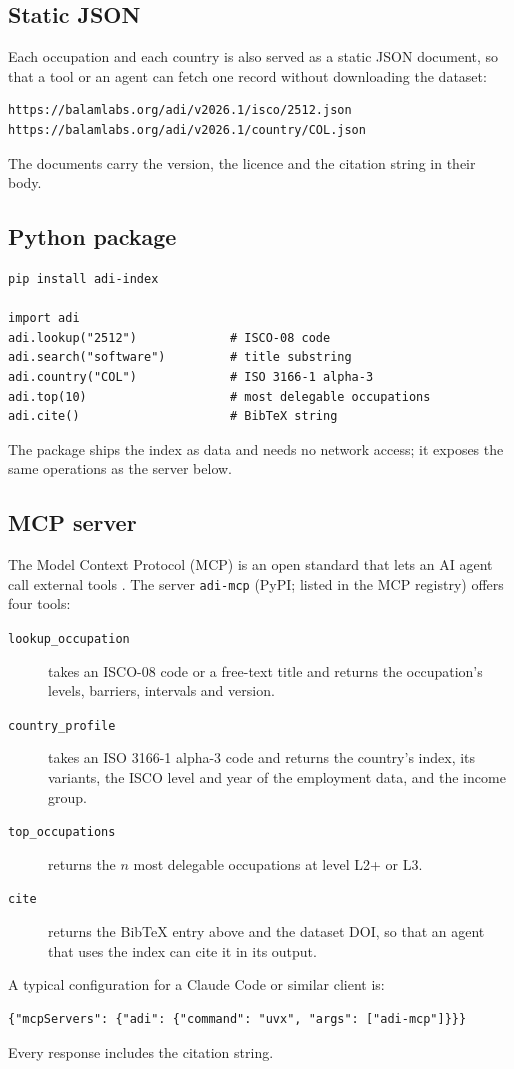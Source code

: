 \subsection{Static JSON}

Each occupation and each country is also served as a static JSON document, so that a tool or an agent can fetch one record without downloading the dataset:
\begin{verbatim}
https://balamlabs.org/adi/v2026.1/isco/2512.json
https://balamlabs.org/adi/v2026.1/country/COL.json
\end{verbatim}
The documents carry the version, the licence and the citation string in their body.

\subsection{Python package}

\begin{verbatim}
pip install adi-index

import adi
adi.lookup("2512")             # ISCO-08 code
adi.search("software")         # title substring
adi.country("COL")             # ISO 3166-1 alpha-3
adi.top(10)                    # most delegable occupations
adi.cite()                     # BibTeX string
\end{verbatim}
The package ships the index as data and needs no network access; it exposes the same operations as the server below.

\subsection{MCP server}

The Model Context Protocol (MCP) is an open standard that lets an AI agent call external tools \citep{mcp2024protocol}.
The server \texttt{adi-mcp} (PyPI; listed in the MCP registry) offers four tools:
\begin{description}
  \item[\texttt{lookup\_occupation}] takes an ISCO-08 code or a free-text title and returns the occupation's levels, barriers, intervals and version.
  \item[\texttt{country\_profile}] takes an ISO 3166-1 alpha-3 code and returns the country's index, its variants, the ISCO level and year of the employment data, and the income group.
  \item[\texttt{top\_occupations}] returns the $n$ most delegable occupations at level L2+ or L3.
  \item[\texttt{cite}] returns the BibTeX entry above and the dataset DOI, so that an agent that uses the index can cite it in its output.
\end{description}
A typical configuration for a Claude Code or similar client is:
\begin{verbatim}
{"mcpServers": {"adi": {"command": "uvx", "args": ["adi-mcp"]}}}
\end{verbatim}
Every response includes the citation string.

